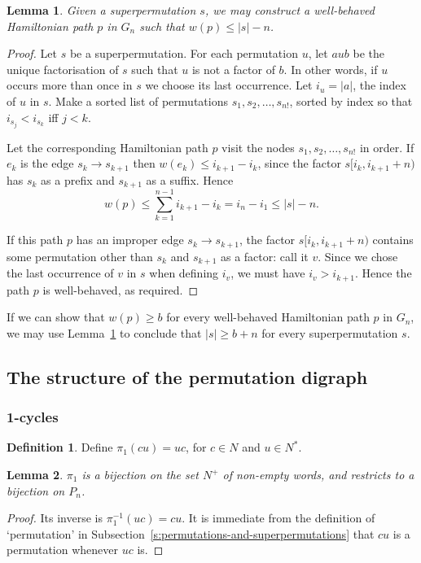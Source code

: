 \documentclass[a4paper]{article}
\newtheorem{lemma}{Lemma}
\theoremstyle{definition}
\newtheorem{defn}{Definition}[section]
\theoremstyle{remark}
\begin{document}
\begin{lemma}\label{lemma:transfer}
    Given a superpermutation $s$, we may construct a well-behaved Hamiltonian path $p$ in $G_n$ such that $w(p) \le |s|-n$.
\end{lemma}
\begin{proof}
Let $s$ be a superpermutation. For each permutation $u$, let $aub$ be the unique factorisation of $s$ such that $u$ is not a factor of $b$. In other words, if $u$ occurs more than once in $s$ we choose its last occurrence. Let $i_u = |a|$, the index of $u$ in $s$. Make a sorted list of permutations $s_1, s_2, \dots, s_{n!}$, sorted by index so that $i_{s_j} < i_{s_k}$ iff $j < k$.

Let the corresponding Hamiltonian path $p$ visit the nodes $s_1, s_2, \dots, s_{n!}$ in order. If $e_k$ is the edge $s_k \to s_{k+1}$ then $w(e_k) \le i_{k+1} - i_k$, since the factor $s[i_k, i_{k+1} + n)$ has $s_k$ as a prefix and $s_{k+1}$ as a suffix. Hence
\[
    w(p) \le \sum_{k=1}^{n-1} i_{k+1} - i_k = i_n - i_1 \le |s| - n.
\]

If this path $p$ has an improper edge $s_k \to s_{k+1}$, the factor $s[i_k, i_{k+1} + n)$ contains some permutation other than $s_k$ and $s_{k+1}$ as a factor: call it $v$. Since we chose the last occurrence of $v$ in $s$ when defining $i_v$, we must have $i_v > i_{k+1}$. Hence the path $p$ is well-behaved, as required.
\end{proof}

If we can show that $w(p) \ge b$ for every well-behaved Hamiltonian path $p$ in $G_n$, we may use Lemma~\ref{lemma:transfer} to conclude that $|s|\ge b+n$ for every superpermutation $s$.

\subsection{The structure of the permutation digraph}
\subsubsection{1-cycles}
\begin{defn}\label{def:pi1}
    Define $\pi_1(cu) = uc$, for $c\in N$ and $u\in N^*$.
\end{defn}
\begin{lemma}\label{lem:pi1-bijection}
    $\pi_1$ is a bijection on the set $N^+$ of non-empty words,
    and restricts to a bijection on $P_n$.
\end{lemma}
\begin{proof}
    Its inverse is $\pi_1^{-1}(uc)=cu$. It is immediate from the definition of `permutation' in Subsection~\ref{s:permutations-and-superpermutations} that $cu$ is a permutation whenever $uc$ is.
\end{proof}
\end{document}
